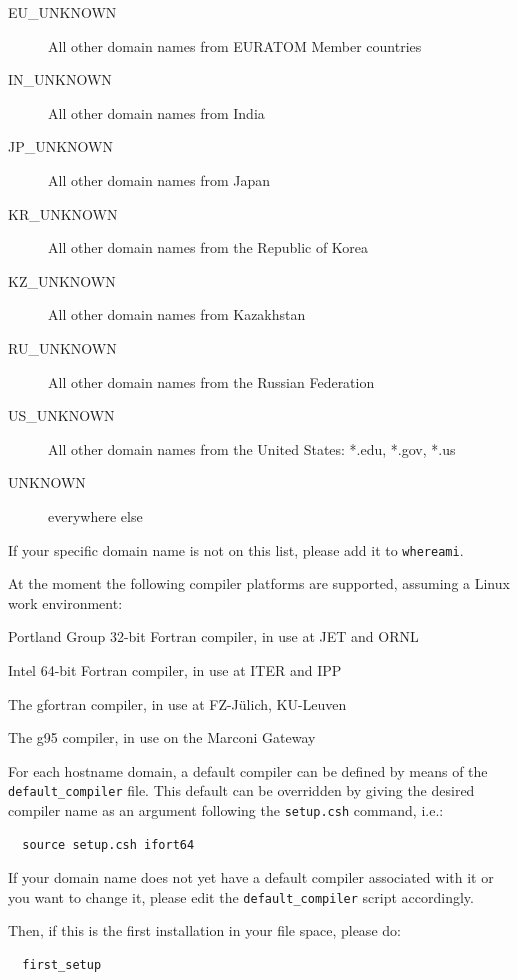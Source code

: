 \documentclass[a4paper,10pt]{report}
\begin{document}
\begin{description}
  \item[EU\_UNKNOWN] All other domain names from EURATOM Member countries
  \item[IN\_UNKNOWN] All other domain names from India
  \item[JP\_UNKNOWN] All other domain names from Japan
  \item[KR\_UNKNOWN] All other domain names from the Republic of Korea
  \item[KZ\_UNKNOWN] All other domain names from Kazakhstan
  \item[RU\_UNKNOWN] All other domain names from the Russian Federation
  \item[US\_UNKNOWN] All other domain names from the United States: *.edu, *.gov, *.us
  \item[UNKNOWN] everywhere else
\end{description}

If your specific domain name is not on this list, please add it to {\tt whereami}.

At the moment the following compiler platforms are supported, assuming a Linux work environment:\label{sec:platforms}
\begin{description}
  \item[pgf90] Portland Group 32-bit Fortran compiler, in use at JET and ORNL
  \item[ifort64] Intel 64-bit Fortran compiler, in use at ITER and IPP
  \item[gfortran] The gfortran compiler, in use at FZ-J{\"u}lich, KU-Leuven
  \item[g95] The g95 compiler, in use on the Marconi Gateway
\end{description}

For each hostname domain, a default compiler can be defined by means of the {\tt default\_compiler}
file. This default can be overridden by giving the desired compiler name as an argument following
the {\tt setup.csh} command, i.e.:
\begin{verbatim}
  source setup.csh ifort64
\end{verbatim}

If your domain name does not yet have a default compiler associated with it or you want to change it,
please edit the {\tt default\_compiler} script accordingly.

Then, if this is the first installation in your file space, please do:
\begin{verbatim}
  first_setup
\end{verbatim}
\end{document}
